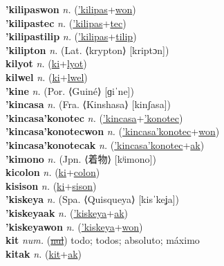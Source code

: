 \textbf{'kilipaswon} \textit{n.} (\hyperref['kilipas]{'kilipas}+\hyperref[won]{won})
 \label{'kilipaswon} \\
\textbf{'kilipastec} \textit{n.} (\hyperref['kilipas]{'kilipas}+\hyperref[tec]{tec})
 \label{'kilipastec} \\
\textbf{'kilipastilip} \textit{n.} (\hyperref['kilipas]{'kilipas}+\hyperref[tilip]{tilip})
 \label{'kilipastilip} \\
\textbf{'kilipton} \textit{n.} (Lat. ⟨krypton⟩ [kriptɔn])
 \label{'kilipton} \\
\textbf{kilyot} \textit{n.} (\hyperref[ki]{ki}+\hyperref[lyot]{lyot})
 \label{kilyot} \\
\textbf{kilwel} \textit{n.} (\hyperref[ki]{ki}+\hyperref[lwel]{lwel})
 \label{kilwel} \\
\textbf{'kine} \textit{n.} (Por. ⟨Guiné⟩ [ɡiˈne])
 \label{'kine} \\
\textbf{'kincasa} \textit{n.} (Fra. ⟨Kinshasa⟩ [kinʃasa])
 \label{'kincasa} \\
\textbf{'kincasa'konotec} \textit{n.} (\hyperref['kincasa]{'kincasa}+\hyperref['konotec]{'konotec})
 \label{'kincasa'konotec} \\
\textbf{'kincasa'konotecwon} \textit{n.} (\hyperref['kincasa'konotec]{'kincasa'konotec}+\hyperref[won]{won})
 \label{'kincasa'konotecwon} \\
\textbf{'kincasa'konotecak} \textit{n.} (\hyperref['kincasa'konotec]{'kincasa'konotec}+\hyperref[ak]{ak})
 \label{'kincasa'konotecak} \\
\textbf{'kimono} \textit{n.} (Jpn. ⟨着物⟩ [kʲimono])
 \label{'kimono} \\
\textbf{kicolon} \textit{n.} (\hyperref[ki]{ki}+\hyperref[colon]{colon})
 \label{kicolon} \\
\textbf{kisison} \textit{n.} (\hyperref[ki]{ki}+\hyperref[sison]{sison})
 \label{kisison} \\
\textbf{'kiskeya} \textit{n.} (Spa. ⟨Quisqueya⟩ [kisˈkeʝa])
 \label{'kiskeya} \\
\textbf{'kiskeyaak} \textit{n.} (\hyperref['kiskeya]{'kiskeya}+\hyperref[ak]{ak})
 \label{'kiskeyaak} \\
\textbf{'kiskeyawon} \textit{n.} (\hyperref['kiskeya]{'kiskeya}+\hyperref[won]{won})
 \label{'kiskeyawon} \\
\textbf{kit} \textit{num.} (\hyperref[nul]{\sout{nul}})
todo; todos; absoluto; máximo \label{kit} \\
\textbf{kitak} \textit{n.} (\hyperref[kit]{kit}+\hyperref[ak]{ak})
 \label{kitak} \\
